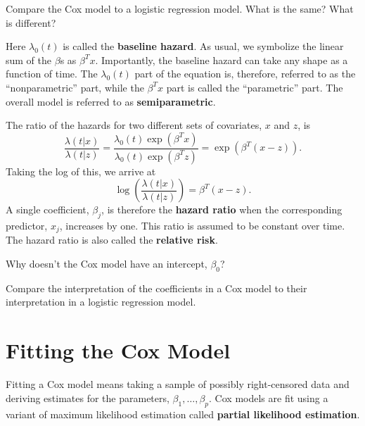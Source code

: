 \vspace{3mm}

\begin{question}{}
Compare the Cox model to a logistic regression model. What is the same? What is different?
\end{question}

Here $\lambda_0(t)$ is called the \textbf{baseline hazard}. As usual, we symbolize the linear sum of the $\beta$s as $\beta^Tx$. Importantly, the baseline hazard can take any shape as a function of time. The $\lambda_0(t)$ part of the equation is, therefore, referred to as the ``nonparametric'' part, while the $\beta^Tx$ part is called the ``parametric'' part. The overall model is referred to as \textbf{semiparametric}. 

The ratio of the hazards for two different sets of covariates, $x$ and $z$, is
$$ \frac{\lambda(t|x)}{\lambda(t|z)} = \frac{\lambda_0(t)\exp(\beta^Tx)}{\lambda_0(t)\exp(\beta^Tz)} = \exp(\beta^T (x-z)). $$
Taking the log of this, we arrive at
$$ \log \left( \frac{\lambda(t|x)}{\lambda(t|z)} \right) = \beta^T (x-z). $$
A single coefficient, $\beta_j$, is therefore the \textbf{hazard ratio} when the corresponding predictor, $x_j$, increases by one. This ratio is assumed to be constant over time. The hazard ratio is also called the \textbf{relative risk}. 

\vspace{5mm}

\begin{question}{}
Why doesn't the Cox model have an intercept, $\beta_0$?
\end{question}

\vspace{1mm}

\begin{question}{}
Compare the interpretation of the coefficients in a Cox model to their interpretation in a logistic regression model. 
\end{question}


\section{Fitting the Cox Model \label{section:coxfit}}

Fitting a Cox model means taking a sample of possibly right-censored data and deriving estimates for the parameters, $\beta_1, \dots, \beta_p$. Cox models are fit using a variant of maximum likelihood estimation called \textbf{partial likelihood estimation}.

